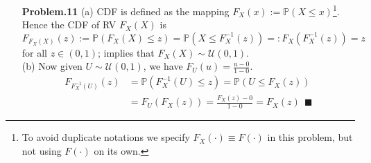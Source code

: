 \documentclass[a4paper, 11pt]{article}
\begin{document}
\begin{itemize}
	\item[\textbf{Problem.11}] (a) CDF is defined as the mapping $F_X(x):=\mathbb{P}\left(X\leq x\right)$\footnote{To avoid duplicate notations we specify $F_X(\cdot)\equiv F(\cdot)$ in this problem, but not using $F(\cdot)$ on its own.}. Hence the CDF of RV $F_X(X)$ is
	\begin{equation}
		F_{F_X(X)}(z) := \mathbb{P}\left(F_X(X)\leq z\right) = \mathbb{P}\left(X\leq F_X^{-1}(z)\right) =: F_X(F_X^{-1}(z)) = z
	\end{equation}
	for all $z\in (0,1)$; implies that $F_X(X) \sim \mathcal{U}(0,1)$.\\
	(b) Now given $U\sim \mathcal{U}(0,1)$, we have $F_U(u)=\frac{u-0}{1-0}$.
	\begin{equation}
		\begin{split}
			F_{F_X^{-1}(U)}(z) &= \mathbb{P}\left(F_X^{-1}(U)\leq z\right) = \mathbb{P}\left(U\leq F_X(z)\right) \\
			&= F_U(F_X(z)) = \frac{F_X(z)-0}{1-0}=F_X(z) ~~\blacksquare
		\end{split}
	\end{equation}
\end{itemize}
\end{document}
